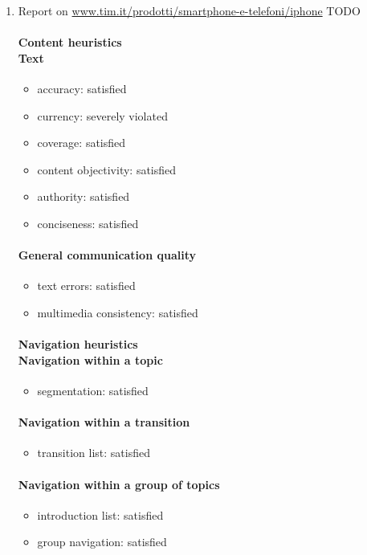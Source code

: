 \begin{enumerate}

\item Report on \url{www.tim.it/prodotti/smartphone-e-telefoni/iphone} TODO
	\paragraph*{Content heuristics \\ Text}
	\begin{itemize}
		\item accuracy: satisfied
		\item currency: severely violated
		\item coverage: satisfied
		\item content objectivity: satisfied
		\item authority: satisfied
		\item conciseness: satisfied		
	\end{itemize}
	
	\paragraph*{General communication quality}
	\begin{itemize}
		\item text errors: satisfied
		\item multimedia consistency: satisfied
	\end{itemize}
	
	\paragraph*{Navigation heuristics \\ Navigation within a topic}
	\begin{itemize}
		\item segmentation: satisfied
	\end{itemize}	
	
	\paragraph*{Navigation within a transition}
	\begin{itemize}
		\item transition list: satisfied
	\end{itemize}
	
	\paragraph*{Navigation within a group of topics}
	\begin{itemize}
		\item introduction list: satisfied
		\item group navigation: satisfied
	\end{itemize}
	

\end{enumerate}
